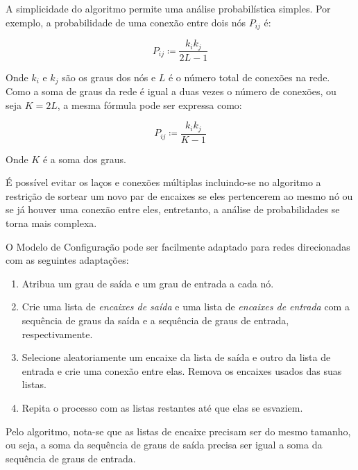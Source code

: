 \documentclass[12pt,a4paper]{article}
\theoremstyle{hypo}
\newcommand{\defn}{\coloneqq} %
\begin{document}
A simplicidade do algoritmo permite uma análise probabilística simples. Por exemplo, a probabilidade de uma conexão entre dois nós $P_{ij}$ é:

\begin{equation} \label{eq:probabilidade-conexao}
P_{ij} \defn \frac{k_i k_j}{2L - 1}
\end{equation}


Onde $k_i$ e $k_j$ são os graus dos nós e $L$ é o número total de conexões na rede. Como a soma de graus da rede é igual a duas vezes o número de conexões, ou seja $K = 2L$, a mesma fórmula pode ser expressa como:

\begin{equation}
P_{ij} \defn \frac{k_i k_j}{K - 1}
\end{equation}

Onde $K$ é a soma dos graus.

É possível evitar os laços e conexões múltiplas incluindo-se no algoritmo a restrição de sortear um novo par de encaixes se eles pertencerem ao mesmo nó ou se já houver uma conexão entre eles, entretanto, a análise de probabilidades se torna mais complexa.

O Modelo de Configuração pode ser facilmente adaptado para redes direcionadas com as seguintes adaptações:

\begin{enumerate}
\item Atribua um grau de saída e um grau de entrada a cada nó.
\item Crie uma lista de \textit{encaixes de saída} e uma lista de \textit{encaixes de entrada} com a sequência de graus da saída e a sequência de graus de entrada, respectivamente.
\item Selecione aleatoriamente um encaixe da lista de saída e outro da lista de entrada e crie uma conexão entre elas. Remova os encaixes usados das suas listas.
\item Repita o processo com as listas restantes até que elas se esvaziem.
\end{enumerate}

Pelo algoritmo, nota-se que as listas de encaixe precisam ser do mesmo tamanho, ou seja, a soma da sequência de graus de saída precisa ser igual a soma da sequência de graus de entrada.

\end{document}
